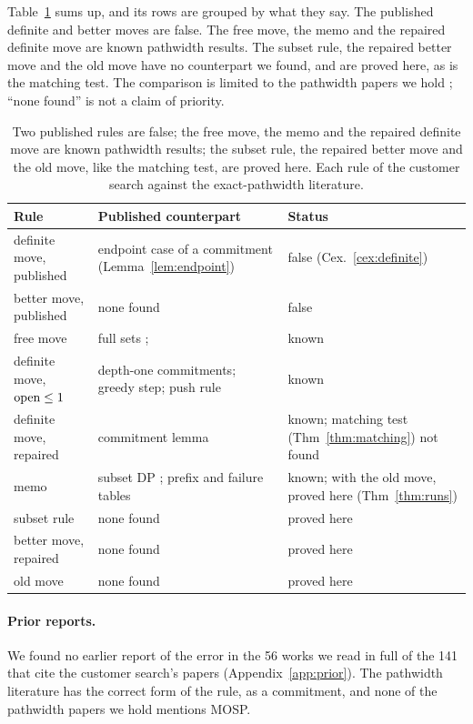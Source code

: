 Table~\ref{tab:known} sums up, and its rows are grouped by what they say. The
published definite and better moves are false. The free move, the memo and
the repaired definite move are known pathwidth results. The subset rule, the repaired
better move and the old move have no counterpart we found, and are proved
here, as is the matching test. The comparison is limited to the pathwidth
papers we hold
\citep{SuchanVillanger2009,Bodlaender2012,CoudertMazauricNisse2014,CoudertMazauricNisse2016,KobayashiKomuroTamaki2014,Kitsunai2016};
``none found'' is not a claim of priority.

\begin{table}[t]
\centering\small
\caption{Two published rules are false; the free move, the memo and the
repaired definite move are known pathwidth results; the subset rule, the
repaired better move and the old move, like the matching test, are proved here.
Each rule of the customer search against the exact-pathwidth literature.}
\label{tab:known}
\begin{tabularx}{\linewidth}{@{}>{\raggedright}p{3.2cm}>{\raggedright}X>{\raggedright\arraybackslash}p{4.1cm}@{}}
\toprule
Rule & Published counterpart & Status \\
\midrule
definite move, published & endpoint case of a commitment (Lemma~\ref{lem:endpoint}) & false (Cex.~\ref{cex:definite}) \\
better move, published & none found & false \\
\midrule
free move & full sets \citep{SuchanVillanger2009}; \citet[Prop.~3]{Kitsunai2016} & known \\
definite move, $\mathrm{open}\le1$ & depth-one commitments; greedy step; push rule & known \\
definite move, repaired & commitment lemma \citep[Lemma~1]{Kitsunai2016} & known; matching test (Thm~\ref{thm:matching}) not found \\
memo & subset DP \citep{Bodlaender2012}; prefix and failure tables & known; with the old move, proved here (Thm~\ref{thm:runs}) \\
\midrule
subset rule & none found & proved here \\
better move, repaired & none found & proved here \\
old move & none found & proved here \\
\bottomrule
\end{tabularx}
\end{table}

\paragraph{Prior reports.} We found no earlier report of the error in the 56
works we read in full of the 141 that cite the customer search's papers
(Appendix~\ref{app:prior}). The pathwidth literature has the correct form of
the rule, as a commitment, and none of the pathwidth papers we hold mentions
MOSP.
